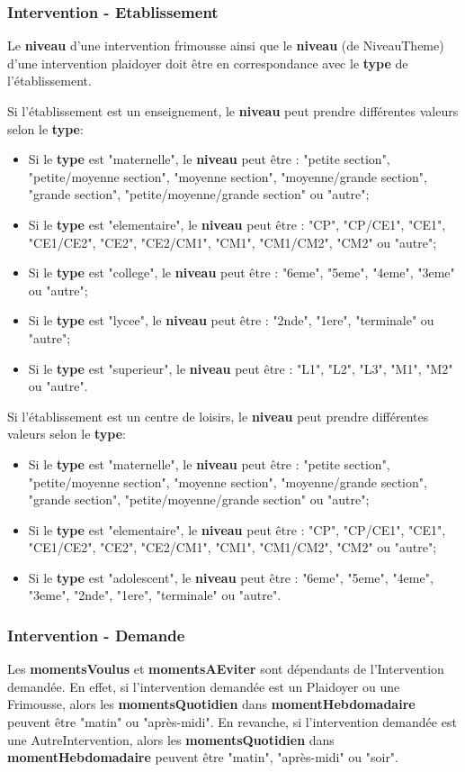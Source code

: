 \subsubsection*{Intervention - Etablissement}
Le \textbf{niveau} d'une intervention frimousse ainsi que le \textbf{niveau} (de NiveauTheme) d'une intervention plaidoyer doit être en correspondance avec le \textbf{type} de l'établissement.  

Si l'établissement est un enseignement, le \textbf{niveau} peut prendre différentes valeurs selon le \textbf{type}:
\begin{itemize}
\item Si le \textbf{type} est "maternelle", le \textbf{niveau} peut être : "petite section", "petite/moyenne section", "moyenne section", "moyenne/grande section", "grande section", "petite/moyenne/grande section" ou "autre";
\item Si le \textbf{type} est "elementaire", le \textbf{niveau} peut être : "CP", "CP/CE1", "CE1", "CE1/CE2", "CE2", "CE2/CM1", "CM1", "CM1/CM2", "CM2" ou "autre";
\item Si le \textbf{type} est "college", le \textbf{niveau} peut être : "6eme", "5eme", "4eme", "3eme" ou "autre";
\item Si le \textbf{type} est "lycee", le \textbf{niveau} peut être : "2nde", "1ere", "terminale" ou "autre";
\item Si le \textbf{type} est "superieur", le \textbf{niveau} peut être : "L1", "L2", "L3", "M1", "M2" ou "autre".
\end{itemize}

Si l'établissement est un centre de loisirs, le \textbf{niveau} peut prendre différentes valeurs selon le \textbf{type}:
\begin{itemize}
\item Si le \textbf{type} est "maternelle", le \textbf{niveau} peut être : "petite section", "petite/moyenne section", "moyenne section", "moyenne/grande section", "grande section", "petite/moyenne/grande section" ou "autre";
\item Si le \textbf{type} est "elementaire", le \textbf{niveau} peut être : "CP", "CP/CE1", "CE1", "CE1/CE2", "CE2", "CE2/CM1", "CM1", "CM1/CM2", "CM2" ou "autre";
\item Si le \textbf{type} est "adolescent", le \textbf{niveau} peut être : "6eme", "5eme", "4eme", "3eme", "2nde", "1ere", "terminale" ou "autre". 
\end{itemize}

\subsubsection*{Intervention - Demande}
Les \textbf{momentsVoulus} et \textbf{momentsAEviter} sont dépendants de l'Intervention demandée. En effet, si l'intervention demandée est un Plaidoyer ou une Frimousse, alors les \textbf{momentsQuotidien} dans \textbf{momentHebdomadaire} peuvent être "matin" ou "après-midi". En revanche, si l'intervention demandée est une AutreIntervention, alors les \textbf{momentsQuotidien} dans \textbf{momentHebdomadaire} peuvent être "matin", "après-midi" ou "soir". 
  

